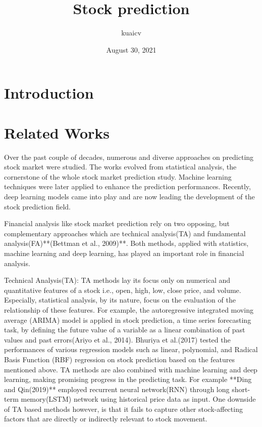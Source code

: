 \documentclass[11pt, oneside, twocolumn]{article}   	%
\title{Stock prediction}
\author{kuaicv}
\date{August 30, 2021}
\renewenvironment{abstract}
{\small
\begin{center}
\bfseries \abstractname\vspace{-.5em}\vspace{0pt}
\end{center}
\list{}{
	\setlength{\leftmargin}{.4cm}
	\setlength{\rightmargin}{\leftmargin}
}
\item\relax}
{\endlist}
\begin{document}
\maketitle


\begin{abstract}
	\blindtext
\end{abstract}

\section{Introduction}
\section{Related Works}
Over the past couple of decades, numerous and diverse approaches on predicting stock market were studied. The works evolved from statistical analysis, the cornerstone of the whole stock market prediction study. Machine learning techniques were later applied to enhance the prediction performances. Recently, deep learning models came into play and are now leading the development of the stock prediction field.

Financial analysis like stock market prediction rely on two opposing, but complementary approaches which are technical analysis(TA) and fundamental analysis(FA)**(Bettman et al., 2009)**. Both methods, applied with statistics, machine learning and deep learning, has played an important role in financial analysis. 

Technical Analysis(TA): TA methods lay its focus only on numerical and quantitative features of a stock i.e., open, high, low, close price, and volume. Especially, statistical analysis, by its nature, focus on the evaluation of the relationship of these features. For example, the autoregressive integrated moving average (ARIMA) model is applied in stock prediction, a time series forecasting task, by defining the future value of a variable as a linear combination of past values and past errors(Ariyo et al., 2014). Bhuriya et al.(2017) tested the performances of various regression models such as linear, polynomial, and Radical Basis Function (RBF) regression on stock prediction based on the features mentioned above. 
TA methods are also combined with machine learning and deep learning, making promising progress in the predicting task. For example **Ding and Qin(2019)** employed recurrent neural network(RNN) through long short-term memory(LSTM) network using historical price data as input. One downside of TA based methods however, is that it fails to capture other stock-affecting factors that are directly or indirectly relevant to stock movement.
\end{document}
